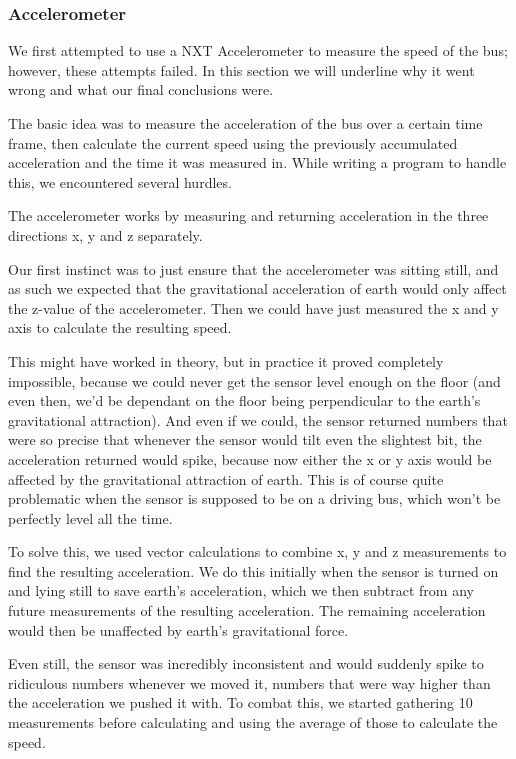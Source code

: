 
\subsubsection{Accelerometer}

We first attempted to use a NXT Accelerometer to measure the speed of the bus; however, these attempts failed. In this section we will underline why it went wrong and what our final conclusions were. 

The basic idea was to measure the acceleration of the bus over a certain time frame, then calculate the current speed using the previously accumulated acceleration and the time it was measured in. While writing a program to handle this, we encountered several hurdles. 

The accelerometer works by measuring and returning acceleration in the three directions x, y and z separately.  

Our first instinct was to just ensure that the accelerometer was sitting still, and as such we expected that the gravitational acceleration of earth would only affect the z-value of the accelerometer. Then we could have just measured the x and y axis to calculate the resulting speed. 

This might have worked in theory, but in practice it proved completely impossible, because we could never get the sensor level enough on the floor (and even then, we'd be dependant on the floor being perpendicular to the earth's gravitational attraction). And even if we could, the sensor returned numbers that were so precise that whenever the sensor would tilt even the slightest bit, the acceleration returned would spike, because now either the x or y axis would be affected by the gravitational attraction of earth. This is of course quite problematic when the sensor is supposed to be on a driving bus, which won't be perfectly level all the time. 

To solve this, we used vector calculations to combine x, y and z measurements to find the resulting acceleration. We do this initially when the sensor is turned on and lying still to save earth's acceleration, which we then subtract from any future measurements of the resulting acceleration. The remaining acceleration would then be unaffected by earth's gravitational force. 

Even still, the sensor was incredibly inconsistent and would suddenly spike to ridiculous numbers whenever we moved it, numbers that were way higher than the acceleration we pushed it with. To combat this, we started gathering 10 measurements before calculating and using the average of those to calculate the speed.

